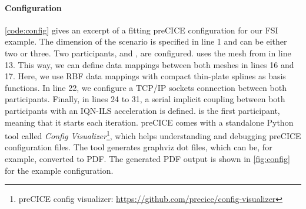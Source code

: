 

    
    




\paragraph{Configuration} \autoref{code:config} gives an excerpt of a fitting preCICE configuration for our FSI example. The dimension of the scenario is specified in line 1 and can be either two or three. Two participants,  and , are configured.  uses the mesh from  in line 13. This way, we can define data mappings between both meshes in lines 16 and 17. Here, we use RBF data mappings with compact thin-plate splines as basis functions. In line 22, we configure a TCP/IP sockets connection between both participants. Finally, in lines 24 to 31, a serial implicit coupling between both participants with an IQN-ILS acceleration is defined.  is the first participant, meaning that it starts each iteration. preCICE comes with a standalone Python tool called \textit{Config Visualizer}\footnote{preCICE config visualizer: \url{https://github.com/precice/config-visualizer}}, which helps understanding and debugging preCICE configuration files. The tool generates graphviz dot files\cite{Ellson03graphviz}, which can be, for example, converted to PDF. The generated PDF output is shown in \autoref{fig:config} for the example configuration.


